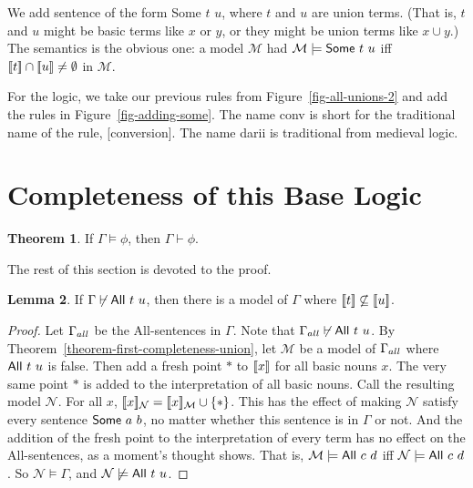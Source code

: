 \documentclass[12pt]{article}
\theoremstyle{definition}
\newtheorem{theorem}{Theorem}
\newtheorem{lemma}[theorem]{Lemma}
\newcommand{\semantics}[1]{[\![\mbox{\em $ #1 $\/}]\!]}
\newcommand{\Model}{\mathcal{M}}
\newcommand{\Nodel}{\mathcal{N}}
\newcommand{\set}[1]{\{ #1 \}}
\newcommand{\proves}{\vdash}
\begin{document}
 We add sentence of the form  {\sf Some $t$ $u$}, where $t$ and $u$
 are union terms.  (That is, $t$ and $u$ might be basic terms like $x$ or $y$, or they
 might be union terms like $x\cup y$.)
 The semantics is the obvious one: a model $\Model$ had $\Model\models\mbox{\sf Some $t$ $u$}$
 iff $\semantics{t} \cap \semantics{u} \neq \emptyset$ in $\Model$.
 
 For the logic, we take our previous rules from Figure~\ref{fig-all-unions-2} and add the
 rules in Figure~\ref{fig-adding-some}.
 The name {\sf conv} is short for the traditional name of the rule,
 [\mbox{\sc conversion}].  The name {\sf darii} is traditional from medieval logic.

 
\section{Completeness of this Base Logic}

\begin{theorem}
 \label{theorem-completeness-all-some-unions}
 If $\Gamma\models\phi$, then $\Gamma\proves\phi$.
  \end{theorem}
 
 The rest of this section is devoted to the proof.
 
  \begin{lemma}\label{lemma-1-all-some-unions}
 If $\Gamma\not\proves \mbox{\sf All $t$ $u$}$, then there is a model of $\Gamma$
 where $\semantics{t}\not\subseteq\semantics{u}$.
\end{lemma}

\begin{proof}
Let $\Gamma_{\scriptsize all}$ be the {\sf All}-sentences in $\Gamma$.
Note that $\Gamma_{\scriptsize all}\not\proves \mbox{\sf All $t$ $u$}$.
By Theorem~\ref{theorem-first-completeness-union}, let $\Model$
be a model of $\Gamma_{\scriptsize all}$ where $\mbox{\sf All $t$ $u$}$ is false.
Then add a fresh point $*$ to $\semantics{x}$ for all basic nouns $x$.
The very same point  $*$  is added to the interpretation of all basic nouns.
Call the resulting model $\Nodel$.
For all $x$, $\semantics{x}_{\Nodel} = \semantics{x}_{\Model}\cup\set{*}$.
This has the effect of making $\Nodel$ satisfy every sentence $\mbox{\sf Some $a$ $b$}$,
no matter whether this sentence is in $\Gamma$ or not.
And the addition of the fresh point to the interpretation of every term
has no effect on the {\sf All}-sentences, as a moment's thought shows.
That is, $\Model\models\mbox{\sf All $c$ $d$}$ iff  $\Nodel\models\mbox{\sf All $c$ $d$}$.
So $\Nodel\models\Gamma$, and $\Nodel\not\models\mbox{\sf All $t$ $u$}$.
\end{proof}
\end{document}

